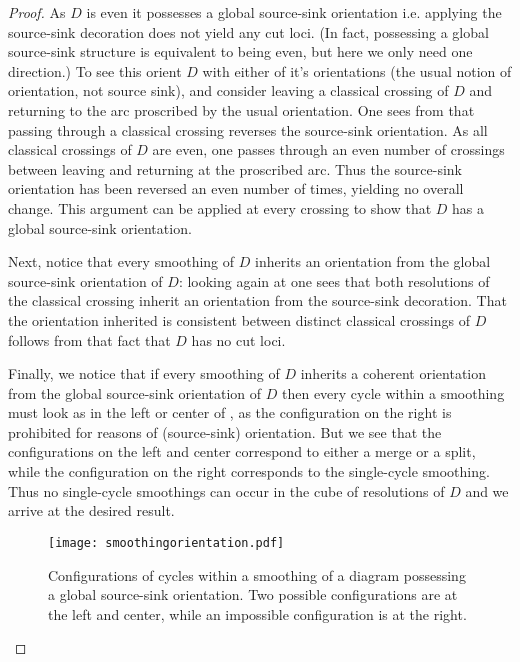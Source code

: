 \documentclass[10pt,oneside]{amsart}
\theoremstyle{definition}
\numberwithin{equation}{section}
\begin{document}
\begin{proof}
	As \( D \) is even it possesses a global source-sink orientation i.e. applying the source-sink decoration does not yield any cut loci. (In fact, possessing a global source-sink structure is equivalent to being even, but here we only need one direction.) To see this orient \( D \) with either of it's orientations (the usual notion of orientation, not source sink), and consider leaving a classical crossing of \( D \) and returning to the arc proscribed by the usual orientation. One sees from  that passing through a classical crossing reverses the source-sink orientation. As all classical crossings of \( D \) are even, one passes through an even number of crossings between leaving and returning at the proscribed arc. Thus the source-sink orientation has been reversed an even number of times, yielding no overall change. This argument can be applied at every crossing to show that \( D \) has a global source-sink orientation.
	
	Next, notice that every smoothing of \( D \) inherits an orientation from the global source-sink orientation of \( D \): looking again at  one sees that both resolutions of the classical crossing inherit an orientation from the source-sink decoration. That the orientation inherited is consistent between distinct classical crossings of \( D \) follows from that fact that \( D \) has no cut loci.
	
	Finally, we notice that if every smoothing of \( D \) inherits a coherent orientation from the global source-sink orientation of \( D \) then every cycle within a smoothing must look as in the left or center of , as the configuration on the right is prohibited for reasons of (source-sink) orientation. But we see that the configurations on the left and center correspond to either a merge or a split, while the configuration on the right corresponds to the single-cycle smoothing. Thus no single-cycle smoothings can occur in the cube of resolutions of \( D \) and we arrive at the desired result.
	
	\begin{figure}
		\texttt{[image: smoothingorientation.pdf]}
		\caption{Configurations of cycles within a smoothing of a diagram possessing a global source-sink orientation. Two possible configurations are at the left and center, while an impossible configuration is at the right.}
		\label{Fig:smoothingorientation}
	\end{figure}
\end{proof}
\end{document}

